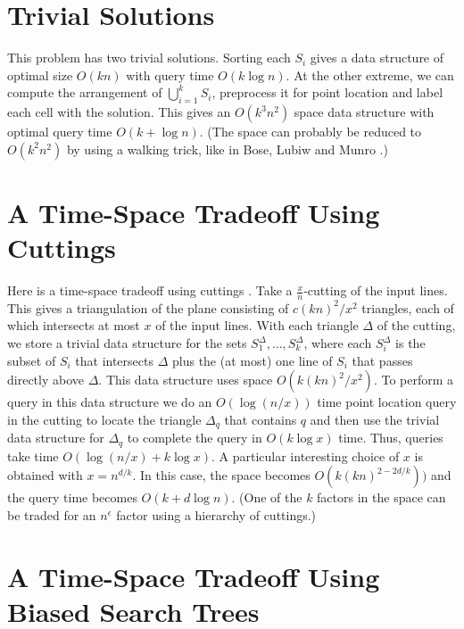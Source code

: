 \documentclass{article}
\begin{document}
\section{Trivial Solutions}

This problem has two trivial solutions.  Sorting each $S_i$ gives a
data structure of optimal size $O(kn)$ with query time $O(k\log n)$.
At the other extreme, we can compute the arrangement of
$\bigcup_{i=1}^k S_i$, preprocess it for point location and label each
cell with the solution.  This gives an $O(k^3n^2)$ space data
structure with optimal query time $O(k + \log n)$.  (The space can
probably be reduced to $O(k^2n^2)$ by using a walking trick, like in
Bose, Lubiw and Munro \cite{blm02}.)

\section{A Time-Space Tradeoff Using Cuttings}

Here is a time-space tradeoff using cuttings \cite{m98}. Take a
$\frac{x}{n}$-cutting of the input lines.  This gives a triangulation
of the plane consisting of $c(kn)^2/x^2$ triangles, each of which
intersects at most $x$ of the input lines.  With each triangle
$\Delta$ of the cutting, we store a trivial data structure for the
sets $S_1^\Delta,\ldots,S_k^\Delta$, where each $S_i^\Delta$ is the
subset of $S_i$ that intersects $\Delta$ plus the (at most) one line
of $S_i$ that passes directly above $\Delta$.  This data structure
uses space $O(k(kn)^2/x^2)$.  To perform a query in this data
structure we do an $O(\log (n/x))$ time point location query in the
cutting to locate the triangle $\Delta_q$ that contains $q$ and then
use the trivial data structure for $\Delta_q$ to complete the query in
$O(k\log x)$ time.  Thus, queries take time $O(\log(n/x) + k\log x)$.
A particular interesting choice of $x$ is obtained with $x=n^{d/k}$.
In this case, the space becomes $O(k(kn)^{2-2d/k}))$ and the query
time becomes $O(k + d\log n)$.  (One of the $k$ factors in the space
can be traded for an $n^\epsilon$ factor using a hierarchy of
cuttings.) 

\section{A Time-Space Tradeoff Using Biased Search Trees}
\end{document}

